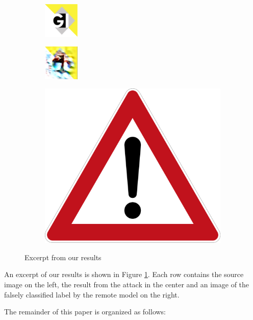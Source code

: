 \begin{figure}
\begin{subfigure}{.19\linewidth}
  \centering
  \includegraphics[width=0.7\linewidth]{imgs/gi}
\end{subfigure}
\begin{subfigure}{.19\linewidth}
  \centering
  \includegraphics[width=0.7\linewidth]{imgs/10}
\end{subfigure}
\begin{subfigure}{.19\linewidth}
  \centering
  \includegraphics[width=0.7\linewidth]{imgs/10_real}
\end{subfigure}
\caption{Excerpt from our results}
\label{fig:eyecatcher}
\end{figure}

An excerpt of our results is shown in Figure \ref{fig:eyecatcher}. Each row contains the source image on the left, the result from the attack in the center and an image of the falsely classified label by the remote model on the right.

The remainder of this paper is organized as follows:

